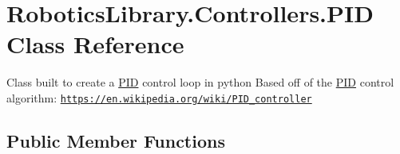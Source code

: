 \hypertarget{class_robotics_library_1_1_controllers_1_1_p_i_d}{}\section{Robotics\+Library.\+Controllers.\+P\+ID Class Reference}
\label{class_robotics_library_1_1_controllers_1_1_p_i_d}


Class built to create a \hyperlink{class_robotics_library_1_1_controllers_1_1_p_i_d}{P\+ID} control loop in python Based off of the \hyperlink{class_robotics_library_1_1_controllers_1_1_p_i_d}{P\+ID} control algorithm\+: \href{https://en.wikipedia.org/wiki/PID_controller}{\tt https\+://en.\+wikipedia.\+org/wiki/\+P\+I\+D\+\_\+controller}  


\subsection*{Public Member Functions}
